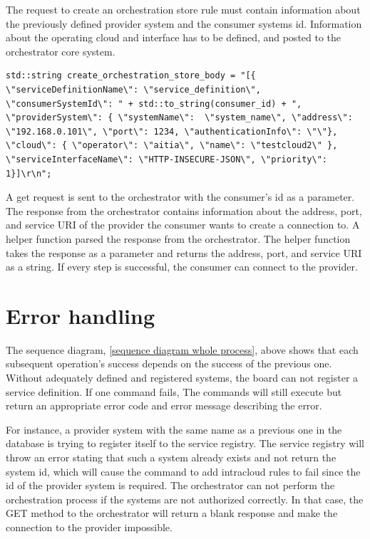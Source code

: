 The request to create an orchestration store rule must contain information about the previously defined provider system and the consumer systems id.
Information about the operating cloud and interface has to be defined, and posted to the orchestrator core system.
\begin{lstlisting}[style=CStyle]
std::string create_orchestration_store_body = "[{ \"serviceDefinitionName\": \"service_definition\", \"consumerSystemId\": " + std::to_string(consumer_id) + ", \"providerSystem\": { \"systemName\":  \"system_name\", \"address\": \"192.168.0.101\", \"port\": 1234, \"authenticationInfo\": \"\"}, \"cloud\": { \"operator\": \"aitia\", \"name\": \"testcloud2\" }, \"serviceInterfaceName\": \"HTTP-INSECURE-JSON\", \"priority\": 1}]\r\n";
\end{lstlisting}
A get request is sent to the orchestrator with the consumer's id as a parameter.
The response from the orchestrator contains information about the address, port, and service URI of the provider the consumer wants to create a connection to.
A helper function parsed the response from the orchestrator.
The helper function takes the response as a parameter and returns the address, port, and service URI as a string.
If every step is successful, the consumer can connect to the provider.

\section{Error handling}
The sequence diagram, \ref{sequence diagram whole process}, above shows that each subsequent operation's success depends on the success of the previous one.
Without adequately defined and registered systems, the board can not register a service definition. If one command fails, 
The commands will still execute but return an appropriate error code and error message describing the error.

For instance, a provider system with the same name as a previous one in the database is trying to register itself to the service registry.
The service registry will throw an error stating that such a system already exists and not return the system id, which will cause the command to add intracloud rules to fail since the id of the provider system is required. 
The orchestrator can not perform the orchestration process if the systems are not authorized correctly.  In that case, the GET method to the orchestrator will return a blank response and make the connection to the provider impossible. 
